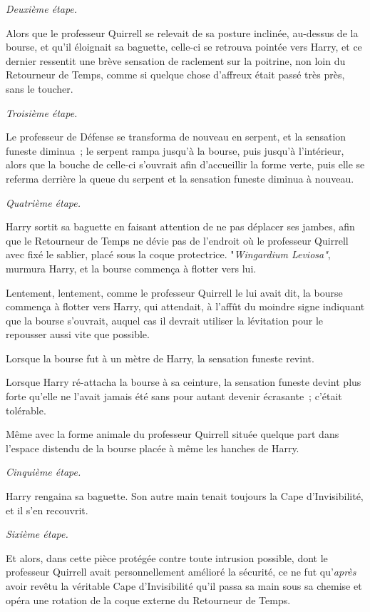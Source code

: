 \emph{Deuxième étape.}

Alors que le professeur Quirrell se relevait de sa posture inclinée, au-dessus de la bourse, et qu'il éloignait sa baguette, celle-ci se retrouva pointée vers Harry, et ce dernier ressentit une brève sensation de raclement sur la poitrine, non loin du Retourneur de Temps, comme si quelque chose d'affreux était passé très près, sans le toucher.

\emph{Troisième étape.}

Le professeur de Défense se transforma de nouveau en serpent, et la sensation funeste diminua~; le serpent rampa jusqu'à la bourse, puis jusqu'à l'intérieur, alors que la bouche de celle-ci s'ouvrait afin d'accueillir la forme verte, puis elle se referma derrière la queue du serpent et la sensation funeste diminua à nouveau.

\emph{Quatrième étape.}

Harry sortit sa baguette en faisant attention de ne pas déplacer ses jambes, afin que le Retourneur de Temps ne dévie pas de l'endroit où le professeur Quirrell avec fixé le sablier, placé sous la coque protectrice. "\emph{Wingardium Leviosa"}, murmura Harry, et la bourse commença à flotter vers lui.

Lentement, lentement, comme le professeur Quirrell le lui avait dit, la bourse commença à flotter vers Harry, qui attendait, à l'affût du moindre signe indiquant que la bourse s'ouvrait, auquel cas il devrait utiliser la lévitation pour le repousser aussi vite que possible.

Lorsque la bourse fut à un mètre de Harry, la sensation funeste revint.

Lorsque Harry ré-attacha la bourse à sa ceinture, la sensation funeste devint plus forte qu'elle ne l'avait jamais été sans pour autant devenir écrasante~; c'était tolérable.

Même avec la forme animale du professeur Quirrell située quelque part dans l'espace distendu de la bourse placée à même les hanches de Harry.

\emph{Cinquième étape.}

Harry rengaina sa baguette. Son autre main tenait toujours la Cape d'Invisibilité, et il s'en recouvrit.

\emph{Sixième étape.}

Et alors, dans cette pièce protégée contre toute intrusion possible, dont le professeur Quirrell avait personnellement amélioré la sécurité, ce ne fut qu'\emph{après} avoir revêtu la véritable Cape d'Invisibilité qu'il passa sa main sous sa chemise et opéra une rotation de la coque externe du Retourneur de Temps.

